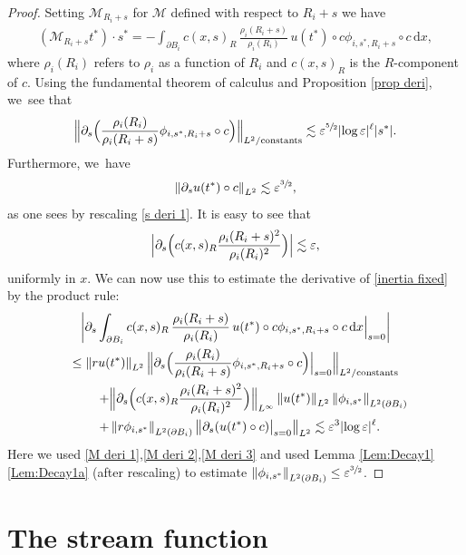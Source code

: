 \documentclass[10pt]{amsart}
\let\epsilon\varepsilon
\newcommand{\constants}{\textup{constants}}
\theoremstyle{definition}
\newcommand\norm[1]{\left\lVert #1\right\rVert}
\newcommand\Bnorm[1]{\Bigl\lVert #1\Bigr\rVert}
\newcommand\eq{=}
\newcommand\dd{\,\mathrm{d}}
\newcommand\dx{\dd x}
\let\de\partial
\let\eps\epsilon
\let\mel\relax
\begin{document}
\begin{proof}
Setting $\mathcal{M}_{R_i+s}$ for $\mathcal{M}$ defined with respect to $R_i+s$ we have
\begin{align}\label{inertia fixed}
(\mathcal{M}_{R_i+s}t^*)\cdot s^*\eq - \int_{\de B_i}c(x,s)_R\,\frac{\rho_i(R_i+s)}{\rho_i(R_i)}\,u(t^*)\circ c\phi_{i,s^*,R_i+s}\circ c\dx,
\end{align}
where $\rho_i(R_i)$ refers to $\rho_i$ as a function of $R_i$ and $c(x,s)_R$ is the $R$-component of $c$. Using the fundamental theorem of calculus and Proposition \ref{prop deri}, we~see that
\begin{equation}
\Bnorm{\de_s \Bigl(\frac{\rho_i(R_i)}{\rho_i(R_i+s)}\phi_{i,s^*,R_i+s}\circ c\Bigr)}_{L^2/\constants}\lesssim \eps^{\sfrac{5}{2}}|{\log\eps}|^\ell|s^*|.\label{M deri 2}
\end{equation}
Furthermore, we~have
\begin{align}
\norm{\de_su(t^*)\circ c}_{L^2}\lesssim \eps^{\sfrac{3}{2}},\label{M deri 1}
\end{align}
as one sees by rescaling \eqref{s deri 1}.
It is easy to see that
\begin{align}
\Bigl|\de_s\Bigl( c(x,s)_R\frac{\rho_i(R_i+s)^2}{\rho_i(R_i)^2}\Bigr)\Bigr|\lesssim \eps,\label{M deri 3}
\end{align}
uniformly in $x$.
We can now use this to estimate the derivative of \eqref{inertia fixed} by the product rule:
\begin{multline*}
\mel\left|\de_s \int_{\de B_i}c(x,s)_R\,\frac{\rho_i(R_i+s)}{\rho_i(R_i)}\,u(t^*)\circ c\phi_{i,s^*,R_i+s}\circ c\dx\Big|_{s=0}\right|\\
\leq \norm{ru(t^*)}_{L^2}\Bnorm{\de_s \Bigl(\frac{\rho_i(R_i)}{\rho_i(R_i+s)}\phi_{i,s^*,R_i+s}\circ c\Bigr)\Big|_{s=0}}_{L^2/\constants}\\
\hspace*{1cm}+\Bnorm{\de_s \Bigl(c(x,s)_R\frac{\rho_i(R_i+s)^2}{\rho_i(R_i)^2}\Bigr)}_{L^\infty}\norm{u(t^*)}_{L^2}\norm{\phi_{i,s^*}}_{L^2(\de B_i)}\\
\:\:\:+\norm{r\phi_{i,s^*}}_{L^2(\de B_i)}\norm{\de_s(u(t^*)\circ c)\big|_{s=0}}_{L^2}\lesssim \eps^3|{\log\eps}|^\ell.
\end{multline*}
Here we used \eqref{M deri 1},\eqref{M deri 2},\eqref{M deri 3} and used Lemma \ref{Lem:Decay1}\,\eqref{Lem:Decay1a} (after rescaling) to estimate $\norm{\phi_{i,s^*}}_{L^2(\de B_i)}\leq \eps^{\sfrac{3}{2}}$.
\end{proof}

\section{The stream function}\label{Section4}
\end{document}
